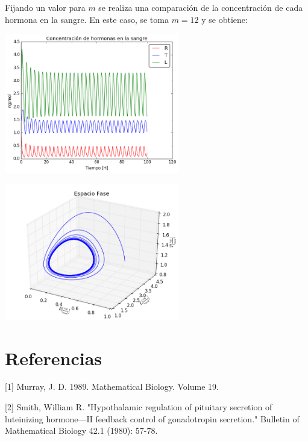 \documentclass[letter,11pt]{article}
\begin{document}
Fijando un valor para $m$ se realiza una comparación de la concentración de cada hormona en la sangre. En este caso, se toma $m=12$ y se obtiene:

\begin{center}
 \includegraphics[width=3in]{imagenes/Graficas/hormonas1.png}
\end{center}

\begin{center}
 \includegraphics[width=3in]{imagenes/Graficas/hormonas2.png}
\end{center}

\section{Referencias}

[1] Murray, J. D. 1989. Mathematical Biology. Volume 19. 

[2] Smith, William R. "Hypothalamic regulation of pituitary secretion of luteinizing hormone—II feedback control of gonadotropin secretion." Bulletin of Mathematical Biology 42.1 (1980): 57-78.
\end{document}
